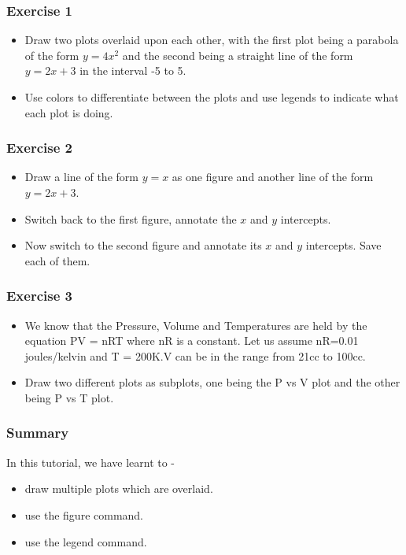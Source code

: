\documentclass[17pt,compress]{beamer}
\begin{document}
\begin{frame}
\frametitle{Exercise 1}
\label{sec-4}
\begin{itemize}
\item Draw two plots overlaid upon each other, with the first plot
being a parabola of the form $y = 4x^2$ and the second being a
straight line of the form $y = 2x + 3$ in the interval -5 to 5.\pause
\item Use colors to differentiate between the plots and use legends to
indicate what each plot is doing.
\end{itemize}
\end{frame}

\begin{frame}
\frametitle{Exercise 2}
\label{sec-5}
\begin{itemize}
\item Draw a line of the form $y = x$ as one figure and another line
of the form $y = 2x + 3$.\pause
\item Switch back to the first figure, annotate the $x$ and $y$ intercepts.\pause
\item Now switch to the second figure and annotate its $x$ and $y$ intercepts.
Save each of them.
\end{itemize}
\end{frame}

\begin{frame}
\frametitle{Exercise 3}
\label{sec-6}
\begin{itemize}
\item We know that the Pressure, Volume and Temperatures are held by the equation PV = nRT where nR is a constant. Let us assume nR=0.01 joules/kelvin and T = 200K.V can be in the range from 21cc to 100cc.\pause
\item Draw two different plots as subplots, one being the P vs V plot and the other being P vs T plot.
\end{itemize}
\end{frame}

\begin{frame}
\frametitle{Summary}
\label{sec-7.1}
In this tutorial, we have learnt to -
\begin{itemize}
\item draw multiple plots which are overlaid.
\item use the figure command.
\item use the legend command.
\end{itemize}
\end{frame}
\end{document}
